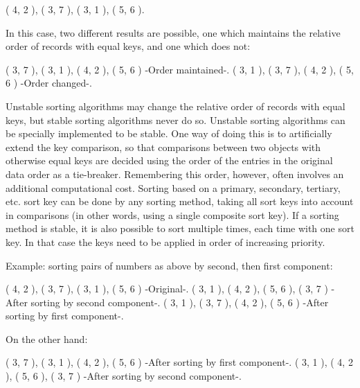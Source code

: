 \begin{center}
( 4, 2 ), ( 3, 7 ), ( 3, 1 ), ( 5, 6 ).
\end{center} \hfill \break

In this case, two different results are possible, one which maintains the relative order of records with equal keys, and one which does not: \hfill \break

\begin{center}
( 3, 7 ), ( 3, 1 ), ( 4, 2 ), ( 5, 6 ) -Order maintained-. \linebreak \linebreak
( 3, 1 ), ( 3, 7 ), ( 4, 2 ), ( 5, 6 ) -Order changed-.
\end{center} \hfill \break

Unstable sorting algorithms may change the relative order of records with equal keys, but stable sorting algorithms never do so. Unstable sorting algorithms can be specially implemented to be stable. One way of doing this is to artificially extend the key comparison, so that comparisons between two objects with otherwise equal keys are decided using the order of the entries in the original data order as a tie-breaker. Remembering this order, however, often involves an additional computational cost. Sorting based on a primary, secondary, tertiary, etc. sort key can be done by any sorting method, taking all sort keys into account in comparisons (in other words, using a single composite sort key). If a sorting method is stable, it is also possible to sort multiple times, each time with one sort key. In that case the keys need to be applied in order of increasing priority. \hfill \break

Example: sorting pairs of numbers as above by second, then first component: \hfill \break

\begin{center}
( 4, 2 ), ( 3, 7 ), ( 3, 1 ), ( 5, 6 ) -Original-. \linebreak \linebreak
( 3, 1 ), ( 4, 2 ), ( 5, 6 ), ( 3, 7 ) -After sorting by second component-. \linebreak \linebreak
( 3, 1 ), ( 3, 7 ), ( 4, 2 ), ( 5, 6 ) -After sorting by first component-.
\end{center} \hfill \break

On the other hand: \hfill \break

\begin{center}
( 3, 7 ), ( 3, 1 ), ( 4, 2 ), ( 5, 6 ) -After sorting by first component-. \linebreak \linebreak
( 3, 1 ), ( 4, 2 ), ( 5, 6 ), ( 3, 7 ) -After sorting by second component-.
\end{center}

\pagebreak